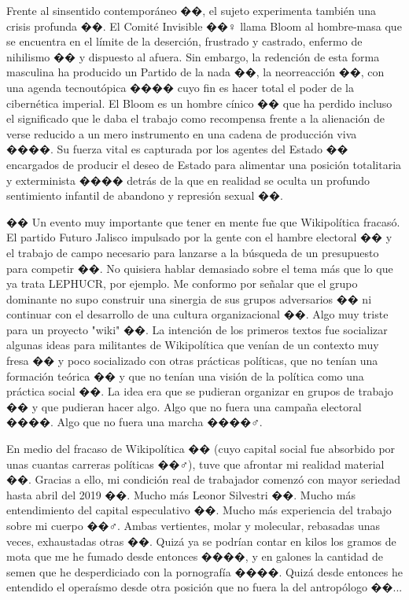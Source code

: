 Frente al sinsentido contemporáneo ��, el sujeto experimenta también una crisis profunda ��. El Comité Invisible ��️‍♀️ llama Bloom al hombre-masa que se encuentra en el límite de la deserción, frustrado y castrado, enfermo de nihilismo ��️ y dispuesto al afuera. Sin embargo, la redención de esta forma masculina ha producido un Partido de la nada ��, la neorreacción ��️, con una agenda tecnoutópica ���� cuyo fin es hacer total el poder de la cibernética imperial. El Bloom es un hombre cínico �� que ha perdido incluso el significado que le daba el trabajo como recompensa frente a la alienación de verse reducido a un mero instrumento en una cadena de producción viva ����. Su fuerza vital es capturada por los agentes del Estado ��️ encargados de producir el deseo de Estado para alimentar una posición totalitaria y exterminista ��️�� detrás de la que en realidad se oculta un profundo sentimiento infantil de abandono y represión sexual ��.

�� Un evento muy importante que tener en mente fue que Wikipolítica fracasó. El partido Futuro Jalisco impulsado por la gente con el hambre electoral ��️ y el trabajo de campo necesario para lanzarse a la búsqueda de un presupuesto para competir ��. No quisiera hablar demasiado sobre el tema más que lo que ya trata LEPHUCR, por ejemplo. Me conformo por señalar que el grupo dominante no supo construir una sinergia de sus grupos adversarios �� ni continuar con el desarrollo de una cultura organizacional ��. Algo muy triste para un proyecto "wiki" ��. La intención de los primeros textos fue socializar algunas ideas para militantes de Wikipolítica que venían de un contexto muy fresa �� y poco socializado con otras prácticas políticas, que no tenían una formación teórica �� y que no tenían una visión de la política como una práctica social ��. La idea era que se pudieran organizar en grupos de trabajo �� y que pudieran hacer algo. Algo que no fuera una campaña electoral ����️. Algo que no fuera una marcha ����‍♂️.

En medio del fracaso de Wikipolítica �� (cuyo capital social fue absorbido por unas cuantas carreras políticas ��‍♂️), tuve que afrontar mi realidad material ��. Gracias a ello, mi condición real de trabajador comenzó con mayor seriedad hasta abril del 2019 ��. Mucho más Leonor Silvestri ��. Mucho más entendimiento del capital especulativo ��. Mucho más experiencia del trabajo sobre mi cuerpo ��️‍♂️. Ambas vertientes, molar y molecular, rebasadas unas veces, exhaustadas otras ��. Quizá ya se podrían contar en kilos los gramos de mota que me he fumado desde entonces ����, y en galones la cantidad de semen que he desperdiciado con la pornografía ����️. Quizá desde entonces he entendido el operaísmo desde otra posición que no fuera la del antropólogo ��...

